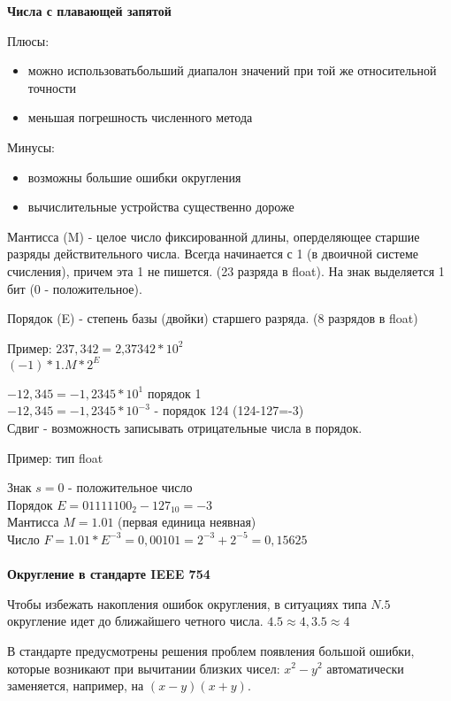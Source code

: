 \documentclass[a4paper,12pt]{report}
\begin{document}
\textbf{Числа с плавающей запятой}

Плюсы:

\begin{itemize}
\item можно использоватьбольший диапалон значений при той же относительной точности
\item меньшая погрешность численного метода
\end{itemize}

Минусы:

\begin{itemize}
\item возможны большие ошибки округления
\item вычислительные устройства существенно дороже
\end{itemize}

Мантисса (M) - целое число фиксированной длины, оперделяющее старшие разряды действительного числа. Всегда начинается с 1 (в двоичной системе счисления), причем эта 1 не пишется. (23 разряда в float). На знак выделяется 1 бит (0 - положительное).

Порядок (E) - степень базы (двойки) старшего разряда. (8 разрядов в float)

Пример: $237,342=\textit{2,37342}*\textbf{$10^2$}$\\
$(-1)*1.M*2^E$

$-12,345=-1,2345*10^1$ порядок 1\\
$-12,345=-1,2345*10^{-3}$ - порядок 124 (124-127=-3)\\

Сдвиг - возможность записывать отрицательные числа в порядок.

Пример: тип float

Знак $s=0$ - положительное число\\
Порядок $E=01111100_2-127_{10}=-3$\\
Мантисса $M=1.01$ (первая единица неявная)\\
Число $F=1.01*E^{-3}=0,00101=2^{-3}+2^{-5}=0,15625$\\
\\

\textbf{Округление в стандарте IEEE 754}

Чтобы избежать накопления ошибок округления, в ситуациях типа $N.5$ округление идет до ближайшего четного числа. $4.5 \approx 4, 3.5 \approx 4$

В стандарте предусмотрены решения проблем появления большой ошибки, которые возникают при вычитании близких чисел: $x^2-y^2$ автоматически заменяется, например, на $(x-y)(x+y)$.
\end{document}
